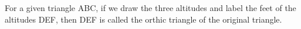 For a given triangle ABC, if we draw the three altitudes and label the
feet of the altitudes DEF, then DEF is called the orthic triangle of
the original triangle.